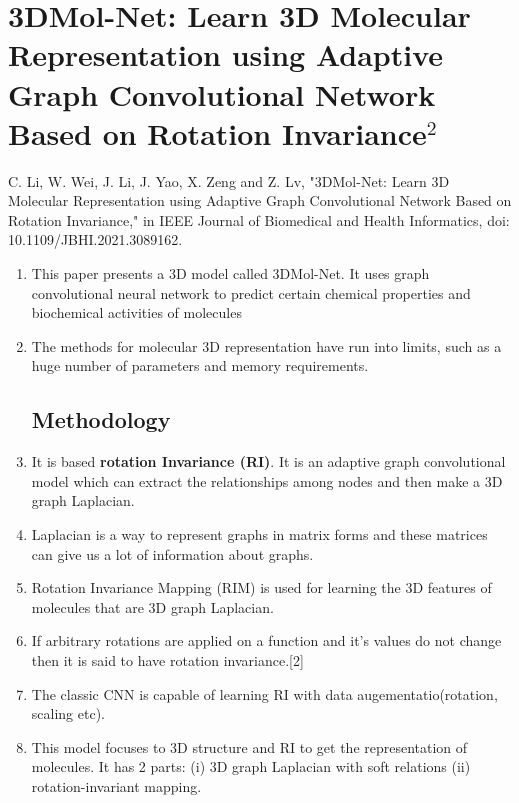 \documentclass[]{report}
\begin{document}
\section{3DMol-Net: Learn 3D Molecular Representation using Adaptive Graph Convolutional Network Based on Rotation Invariance$^{2}$}
C. Li, W. Wei, J. Li, J. Yao, X. Zeng and Z. Lv, "3DMol-Net: Learn 3D Molecular Representation using Adaptive Graph Convolutional Network Based on Rotation Invariance," in IEEE Journal of Biomedical and Health Informatics, doi: 10.1109/JBHI.2021.3089162.
\begin{enumerate}
	\subsection{Introduction}
	\item This paper presents a 3D model called 3DMol-Net. It uses graph convolutional neural network to predict certain chemical properties and biochemical activities of molecules
	\item The methods for molecular 3D representation have run into limits, such as a huge number of parameters and memory requirements.
	\subsection{Methodology}
	\item It is based \textbf{rotation Invariance (RI)}. It is an adaptive graph convolutional model which can extract the relationships among nodes and then make a 3D graph Laplacian.
	\item Laplacian is a way to represent graphs in matrix forms and these matrices can give us a lot of information about graphs.
	\item Rotation Invariance Mapping (RIM) is used for learning the 3D features of molecules that are 3D graph Laplacian.
	\item If arbitrary rotations are applied on a function and it's values do not change then it is said to have rotation invariance.[2]
	\item The classic CNN is capable of learning RI with data augementatio(rotation, scaling etc).
	\item This model focuses to 3D structure and RI to get the representation of molecules. It has 2 parts: (i) 3D graph Laplacian
	with soft relations (ii) rotation-invariant mapping.
	

\end{enumerate}
\end{document}
